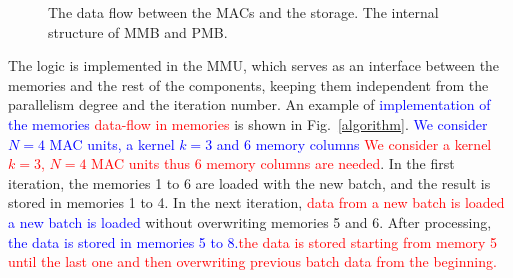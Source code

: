 \documentclass[conference,compsoc]{IEEEtran}
\begin{document}
\begin{figure}[!t]
\centering
{}
\hfil
\centering
{}
\caption{\protect{} The data flow between the MACs and the
  storage. \protect{} The internal structure of MMB and PMB.}
\label{muxes}
\end{figure}

The logic is implemented in the MMU, which serves as an interface between the
memories and the rest of the components, keeping them independent from the
parallelism degree and the iteration number. An example of \textcolor{blue}{implementation of the
memories} \textcolor{red}{data-flow in memories} is shown in Fig.~\ref{algorithm}. \textcolor{blue}{We consider $N=4$ MAC units, a kernel
$k=3$ and 6 memory columns} \textcolor{red}{We consider a kernel $k=3$, $N=4$ MAC
units thus 6 memory columns are needed}. In the first iteration, the memories 1 to 6 
are loaded with the new batch, and the result is stored in memories 1 to 4. In the next
iteration, \textcolor{red}{data from a new batch is loaded }\textcolor{blue}{a new batch is loaded} without overwriting memories 5 and 6. After
processing, \textcolor{blue}{the data is stored in memories 5 to
  8.}\textcolor{red}{the data is stored starting from memory 5 until the last
  one and then overwriting previous batch data from the beginning.}
\end{document}

